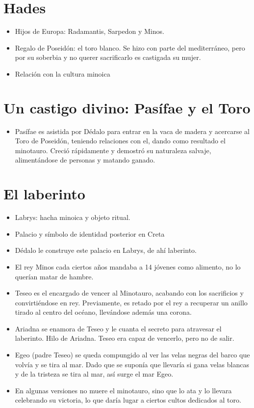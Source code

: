 \section{Hades}
\begin{itemize}
    \item Hijos de Europa: Radamantis, Sarpedon y Minos.
    \item Regalo de Poseidón: el toro blanco. Se hizo con parte del mediterráneo, pero por su soberbia y no querer sacrificarlo es castigada su mujer.
    \item Relación con la cultura minoica
\end{itemize}

\section{Un castigo divino: Pasífae y el Toro}
\begin{itemize}
    \item Pasífae es asistida por Dédalo para entrar en la vaca de madera y acercarse al Toro de Poseidón, teniendo relaciones con el, dando como resultado el minotauro. Creció rápidamente y demostró su naturaleza salvaje, alimentándose de personas y matando ganado.
\end{itemize}

\section{El laberinto}
\begin{itemize}
    \item Labrys: hacha minoica y objeto ritual.
    \item Palacio y símbolo de identidad posterior en Creta
    \item Dédalo le construye este palacio en Labrys, de ahí laberinto.
    \item El rey Minos cada ciertos años mandaba a 14 jóvenes como alimento, no lo querían matar de hambre.
    \item Teseo es el encargado de vencer al Minotauro, acabando con los sacrificios y convirtiéndose en rey. Previamente, es retado por el rey a recuperar un anillo tirado al centro del océano, llevándose además una corona.
    \item Ariadna se enamora de Teseo  y le cuanta el secreto para atravesar el laberinto. Hilo de Ariadna. Teseo era capaz de vencerlo, pero no de salir.
    \item Egeo (padre Teseo) se queda compungido al ver las velas negras del barco que volvía y se tira al mar. Dado que se suponía que llevaría si gana velas blancas y de la tristeza se tira al mar, así surge el mar Egeo.
    \item En algunas versiones no muere el minotauro, sino que lo ata y lo llevara celebrando su victoria, lo que daría lugar a ciertos cultos dedicados al toro.
\end{itemize}

